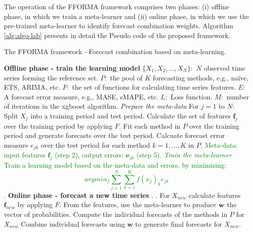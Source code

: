 \documentclass[11pt,a4paper,]{article}
\theoremstyle{definition}
\theoremstyle{definition}
\theoremstyle{definition}
\theoremstyle{remark}
\begin{document}
The operation of the FFORMA framework comprises two phases: (i) offline
phase, in which we train a meta-learner and (ii) online phase, in which
we use the pre-trained meta-learner to identify forecast combination
weights. Algorithm \ref{alg:algo-lab} presents in detail the Pseudo code
of the proposed framework.

\begin{algorithm}[!ht]
  \caption{The FFORMA framework - Forecast combination based on meta-learning. }
  \label{alg:algo-lab}
  \begin{algorithmic}[1]
    \Statex \textbf{Offline phase - train the learning model}
    \Statex {}
    \Statex \hspace{1cm}$\{X_1, X_2, \dots,X_N\}:$ $N$ observed time series forming the reference set.
      \Statex \hspace{1cm}$P:$ the pool of $K$ forecasting methods, e.g., naïve, ETS, ARIMA, etc.
         \Statex \hspace{1cm}$F:$ the set of functions for calculating time series features.
         \Statex \hspace{1cm}$E:$ A forecast error measure, e.g., MASE, sMAPE, etc.
           \Statex \hspace{1cm}$L:$ Loss function.
           \Statex \hspace{1cm}$M:$ number of iterations in the xgboost algorithm.
     \Statex {}
      \Statex \hspace{1cm}
      \Statex {}
    \Statex \textit{Prepare the meta-data}
    \Statex For $j=1$ to $N$:
            \State Split $X_j$ into a training period and test period.
            \State Calculate the set of features $\bm{f}_j$ over the training period by applying $F$.
            \State Fit each method in $P$ over the training period and generate forecasts over the test period.
            \State Calcuate forecast error measure  $e_{jk}$ over the test period for each method $k=1,\ldots, K$ in $P$.
 \textcolor{green}{\State Meta-data: input features $\bm{f}_j$ (step 2), output errors: $\bm{e}_{jk}$ (step 5).
     \Statex
    \Statex \textit{Train the meta-learner}
            \State Train a learning model based on the meta-data and errors, by minimizing:
            $$ argmin_f \sum_{j=1}^N \sum_{k=1}^K f(x_j)_k e_{jk}  $$
            .}
    \Statex
     \Statex \textbf{Online phase - forecast a new time series}
    \Statex {}
    \Statex \hspace{1cm} .
     \Statex {}
      \Statex \hspace{1cm}.
  \State For $X_{new}$ calculate features $\bm{f}_{new}$ by applying $F$.
  \State From the features, use the meta-learner to produce $\bf{w}$ the vector of probabilities. 
  \State Compute the individual forecasts of the methods in $P$ for $X_{new}$
  \State Combine individual forecasts using $\bm{w}$ to generate final forecasts for {$X_{new}$}.
   \end{algorithmic}


\end{algorithm}
\end{document}

